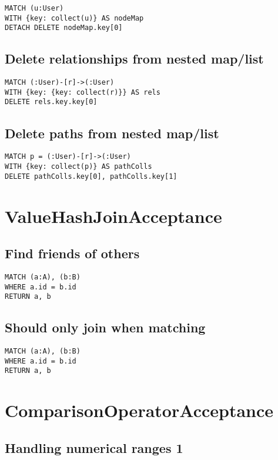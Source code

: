 \begin{lstlisting}
MATCH (u:User)
WITH {key: collect(u)} AS nodeMap
DETACH DELETE nodeMap.key[0]
\end{lstlisting}

\subsection{Delete relationships from nested map/list}

\begin{lstlisting}
MATCH (:User)-[r]->(:User)
WITH {key: {key: collect(r)}} AS rels
DELETE rels.key.key[0]
\end{lstlisting}

\subsection{Delete paths from nested map/list}

\begin{lstlisting}
MATCH p = (:User)-[r]->(:User)
WITH {key: collect(p)} AS pathColls
DELETE pathColls.key[0], pathColls.key[1]
\end{lstlisting}
\section{ValueHashJoinAcceptance}


\subsection{Find friends of others}

\begin{lstlisting}
MATCH (a:A), (b:B)
WHERE a.id = b.id
RETURN a, b
\end{lstlisting}

\subsection{Should only join when matching}

\begin{lstlisting}
MATCH (a:A), (b:B)
WHERE a.id = b.id
RETURN a, b
\end{lstlisting}
\section{ComparisonOperatorAcceptance}


\subsection{Handling numerical ranges 1}


